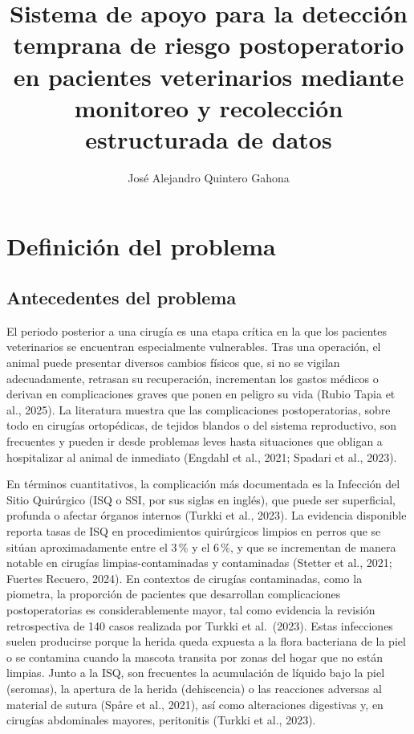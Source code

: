 \documentclass[stu, spanish]{apa7}
\title{Sistema de apoyo para la detecci\'{o}n temprana de riesgo postoperatorio en pacientes veterinarios mediante monitoreo y recolecci\'{o}n estructurada de datos}
\author{Jos\'{e} Alejandro Quintero Gahona}
\affiliation{Universidad Tecnológica de Pereira}
\begin{document}
\maketitle

\section{Definici\'{o}n del problema}

\subsection{Antecedentes del problema}
El periodo posterior a una cirug\'{i}a es una etapa cr\'{i}tica en la que los pacientes veterinarios se encuentran especialmente vulnerables. Tras una operaci\'{o}n, el animal puede presentar diversos cambios f\'{i}sicos que, si no se vigilan adecuadamente, retrasan su recuperaci\'{o}n, incrementan los gastos m\'{e}dicos o derivan en complicaciones graves que ponen en peligro su vida (Rubio Tapia et al., 2025). La literatura muestra que las complicaciones postoperatorias, sobre todo en cirug\'{i}as ortop\'{e}dicas, de tejidos blandos o del sistema reproductivo, son frecuentes y pueden ir desde problemas leves hasta situaciones que obligan a hospitalizar al animal de inmediato (Engdahl et al., 2021; Spadari et al., 2023).

En t\'{e}rminos cuantitativos, la complicaci\'{o}n m\'{a}s documentada es la Infecci\'{o}n del Sitio Quir\'{u}rgico (ISQ o SSI, por sus siglas en ingl\'{e}s), que puede ser superficial, profunda o afectar \'{o}rganos internos (Turkki et al., 2023). La evidencia disponible reporta tasas de ISQ en procedimientos quir\'{u}rgicos limpios en perros que se sit\'{u}an aproximadamente entre el 3\,\% y el 6\,\%, y que se incrementan de manera notable en cirug\'{i}as limpias-contaminadas y contaminadas (Stetter et al., 2021; Fuertes Recuero, 2024). En contextos de cirug\'{i}as contaminadas, como la piometra, la proporci\'{o}n de pacientes que desarrollan complicaciones postoperatorias es considerablemente mayor, tal como evidencia la revisi\'{o}n retrospectiva de 140 casos realizada por Turkki et al.\ (2023). Estas infecciones suelen producirse porque la herida queda expuesta a la flora bacteriana de la piel o se contamina cuando la mascota transita por zonas del hogar que no est\'{a}n limpias. Junto a la ISQ, son frecuentes la acumulaci\'{o}n de l\'{i}quido bajo la piel (seromas), la apertura de la herida (dehiscencia) o las reacciones adversas al material de sutura (Sp\r{a}re et al., 2021), as\'{i} como alteraciones digestivas y, en cirug\'{i}as abdominales mayores, peritonitis (Turkki et al., 2023).
\end{document}
